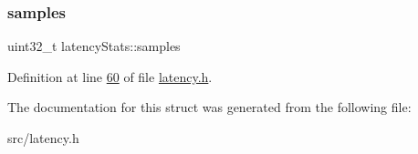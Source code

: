 \subsubsection{\texorpdfstring{samples}{samples}}
{\footnotesize\ttfamily uint32\+\_\+t latency\+Stats\+::samples}



Definition at line \hyperlink{latency_8h_source_l00060}{60} of file \hyperlink{latency_8h_source}{latency.\+h}.



The documentation for this struct was generated from the following file\+:\begin{DoxyCompactItemize}
\item 
src/latency.\+h\end{DoxyCompactItemize}
